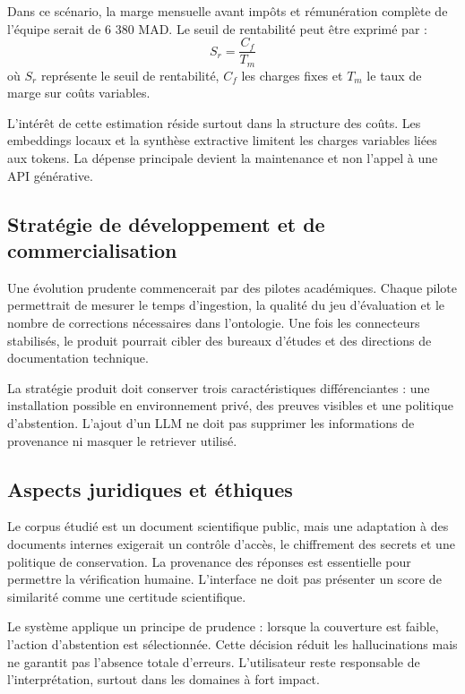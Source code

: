 \documentclass[12pt,a4paper,oneside]{report}
\begin{document}
Dans ce scénario, la marge mensuelle avant impôts et rémunération complète de l'équipe serait de 6 380 MAD. Le seuil de rentabilité peut être exprimé par :
\begin{equation}
S_r = \frac{C_f}{T_m}
\end{equation}
où $S_r$ représente le seuil de rentabilité, $C_f$ les charges fixes et $T_m$ le taux de marge sur coûts variables.

L'intérêt de cette estimation réside surtout dans la structure des coûts. Les embeddings locaux et la synthèse extractive limitent les charges variables liées aux tokens. La dépense principale devient la maintenance et non l'appel à une API générative.

\subsection{Stratégie de développement et de commercialisation}
Une évolution prudente commencerait par des pilotes académiques. Chaque pilote permettrait de mesurer le temps d'ingestion, la qualité du jeu d'évaluation et le nombre de corrections nécessaires dans l'ontologie. Une fois les connecteurs stabilisés, le produit pourrait cibler des bureaux d'études et des directions de documentation technique.

La stratégie produit doit conserver trois caractéristiques différenciantes : une installation possible en environnement privé, des preuves visibles et une politique d'abstention. L'ajout d'un LLM ne doit pas supprimer les informations de provenance ni masquer le retriever utilisé.

\subsection{Aspects juridiques et éthiques}
Le corpus étudié est un document scientifique public, mais une adaptation à des documents internes exigerait un contrôle d'accès, le chiffrement des secrets et une politique de conservation. La provenance des réponses est essentielle pour permettre la vérification humaine. L'interface ne doit pas présenter un score de similarité comme une certitude scientifique.

Le système applique un principe de prudence : lorsque la couverture est faible, l'action d'abstention est sélectionnée. Cette décision réduit les hallucinations mais ne garantit pas l'absence totale d'erreurs. L'utilisateur reste responsable de l'interprétation, surtout dans les domaines à fort impact.
\end{document}
